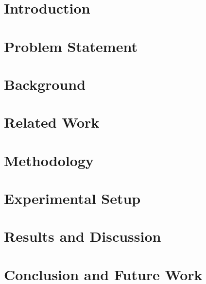 \documentclass[11pt,twoside,openany]{book}
\begin{document}
\chapter{Introduction}


\chapter{Problem Statement}


\chapter{Background}


\chapter{Related Work}


\chapter{Methodology}


\chapter{Experimental Setup}


\chapter{Results and Discussion}


\chapter{Conclusion and Future Work}


\backmatter



\end{document}
